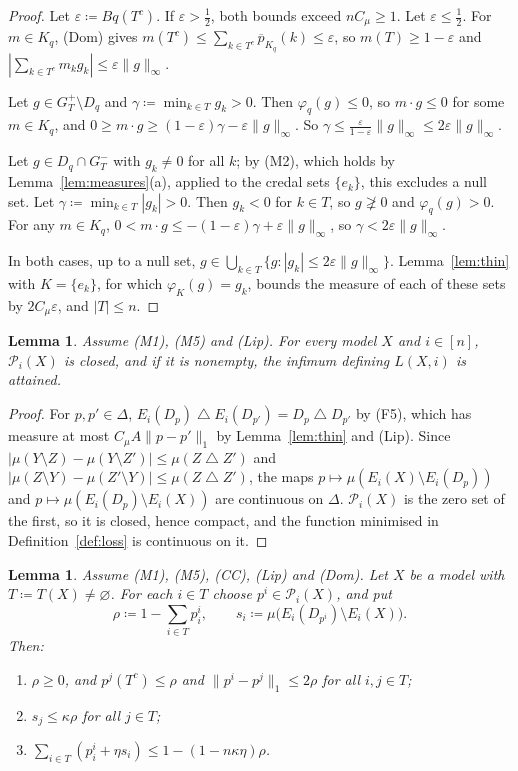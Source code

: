 \documentclass[11pt]{article}
\newtheorem{lemma}[theorem]{Lemma}
\theoremstyle{definition}
\newcommand{\Pc}{\mathcal P}
\newcommand{\sd}{\mathbin{\triangle}}
\newcommand{\up}{\overline{p}}
\newcommand{\gneqz}{\gneq 0}
\begin{document}
\begin{proof}
Let $\varepsilon\coloneqq Bq(T^c)$. If $\varepsilon>\frac12$, both bounds exceed $nC_\mu\ge1$. Let $\varepsilon\le\frac12$. For $m\in K_q$, (Dom) gives $m(T^c)\le\sum_{k\in T^c}\up_{K_q}(k)\le\varepsilon$, so $m(T)\ge1-\varepsilon$ and $|\sum_{k\in T^c}m_kg_k|\le\varepsilon\|g\|_\infty$.

Let $g\in G_T^+\setminus D_q$ and $\gamma\coloneqq\min_{k\in T}g_k>0$. Then $\varphi_q(g)\le0$, so $m\cdot g\le0$ for some $m\in K_q$, and $0\ge m\cdot g\ge(1-\varepsilon)\gamma-\varepsilon\|g\|_\infty$. So $\gamma\le\frac{\varepsilon}{1-\varepsilon}\|g\|_\infty\le2\varepsilon\|g\|_\infty$.

Let $g\in D_q\cap G_T^-$ with $g_k\ne0$ for all $k$; by (M2), which holds by Lemma~\ref{lem:measures}(a), applied to the credal sets $\{e_k\}$, this excludes a null set. Let $\gamma\coloneqq\min_{k\in T}|g_k|>0$. Then $g_k<0$ for $k\in T$, so $g\not\gneqz$ and $\varphi_q(g)>0$. For any $m\in K_q$, $0<m\cdot g\le-(1-\varepsilon)\gamma+\varepsilon\|g\|_\infty$, so $\gamma<2\varepsilon\|g\|_\infty$.

In both cases, up to a null set, $g\in\bigcup_{k\in T}\{g:|g_k|\le2\varepsilon\|g\|_\infty\}$. Lemma~\ref{lem:thin} with $K=\{e_k\}$, for which $\varphi_K(g)=g_k$, bounds the measure of each of these sets by $2C_\mu\varepsilon$, and $|T|\le n$.
\end{proof}

\begin{lemma}\label{lem:attain}
Assume (M1), (M5) and (Lip). For every model $X$ and $i\in[n]$, $\Pc_i(X)$ is closed, and if it is nonempty, the infimum defining $L(X,i)$ is attained.
\end{lemma}

\begin{proof}
For $p,p'\in\Delta$, $E_i(D_p)\sd E_i(D_{p'})=D_p\sd D_{p'}$ by (F5), which has measure at most $C_\mu A\|p-p'\|_1$ by Lemma~\ref{lem:thin} and (Lip). Since $|\mu(Y\setminus Z)-\mu(Y\setminus Z')|\le\mu(Z\sd Z')$ and $|\mu(Z\setminus Y)-\mu(Z'\setminus Y)|\le\mu(Z\sd Z')$, the maps $p\mapsto\mu(E_i(X)\setminus E_i(D_p))$ and $p\mapsto\mu(E_i(D_p)\setminus E_i(X))$ are continuous on $\Delta$. $\Pc_i(X)$ is the zero set of the first, so it is closed, hence compact, and the function minimised in Definition~\ref{def:loss} is continuous on it.
\end{proof}

\begin{lemma}\label{lem:budget}
Assume (M1), (M5), (CC), (Lip) and (Dom). Let $X$ be a model with $T\coloneqq T(X)\ne\varnothing$. For each $i\in T$ choose $p^i\in\Pc_i(X)$, and put
\[
\rho\coloneqq1-\sum_{i\in T}p^i_i,\qquad s_i\coloneqq\mu\big(E_i(D_{p^i})\setminus E_i(X)\big).
\]
Then:
\begin{enumerate}[label=(\roman*)]
\item $\rho\ge0$, and $p^j(T^c)\le\rho$ and $\|p^i-p^j\|_1\le2\rho$ for all $i,j\in T$;
\item $s_j\le\kappa\rho$ for all $j\in T$;
\item $\sum_{i\in T}(p^i_i+\eta s_i)\le1-(1-n\kappa\eta)\rho$.
\end{enumerate}
\end{lemma}
\end{document}
